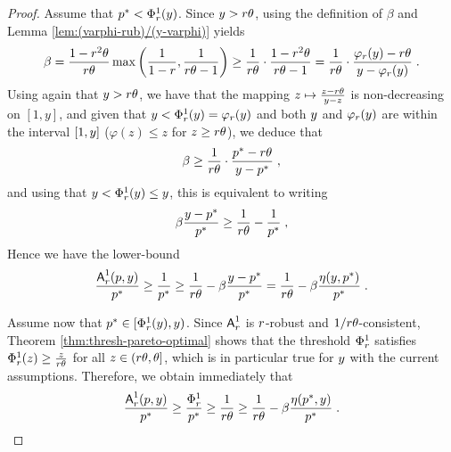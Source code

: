 \begin{proof}
Assume that $p^* < \Phi^1_r(y)$. Since $y > r \theta$, using the definition of $\beta$ and Lemma \ref{lem:(varphi-rub)/(y-varphi)} yields
\[
\beta 
= \frac{1-r^2\theta}{r \theta} \max\left( \frac{1}{1-r}, \frac{1}{r \theta - 1}\right)
\geq \frac{1}{r\theta}\cdot \frac{1-r^2\theta}{r\theta-1}
= \frac{1}{r\theta}\cdot \frac{\varphi_r(y)-r\theta}{y - \varphi_r(y)}\;.
\]
Using again that $y > r \theta$, we have that the mapping $z \mapsto \frac{z-r\theta}{y-z}$ is non-decreasing on $[1 , y]$, and given that $y < \Phi^1_r(y) = \varphi_r(y)$ and both $y$ and $\varphi_r(y)$ are within the interval $[1,y]$ ($\varphi(z) \leq z$ for $z \geq r \theta$), we deduce that
\[
\beta \geq \frac{1}{r\theta}\cdot \frac{p^*-r\theta}{y - p^*}\;,
\]
and using that $y < \Phi^1_r(y) \leq y$, this is equivalent to writing
\[
\beta \frac{y - p^*}{p^*} \geq \frac{1}{r \theta} - \frac{1}{p^*}\;,
\]
Hence we have the lower-bound
\[
\frac{\mbox{\textup{\textsf{A}}}^1_r(p,y)}{p^*} \geq \frac{1}{p^*} \geq \frac{1}{r \theta} - \beta \frac{y - p^*}{p^*}
= \frac{1}{r \theta} - \beta \frac{\eta(y, p^*)}{p^*}\;.
\]


Assume now that $p^* \in [\Phi^1_r(y), y)$. Since $\mbox{\textup{\textsf{A}}}^1_r$ is $r$-robust and $1/r\theta$-consistent, Theorem \ref{thm:thresh-pareto-optimal} shows that the threshold $\Phi^1_r$ satisfies $\Phi^1_r(z) \geq \frac{z}{r \theta}$ for all $z \in (r \theta, \theta]$, which is in particular true for $y$ with the current assumptions. Therefore, we obtain immediately that
\[
\frac{\mbox{\textup{\textsf{A}}}^1_r(p, y)}{p^*} \geq \frac{\Phi^1_r}{p^*} 
\geq \frac{1}{r \theta}
\geq \frac{1}{r \theta} - \beta \frac{\eta(p^*, y)}{p^*}\;.
\]



\end{proof}
